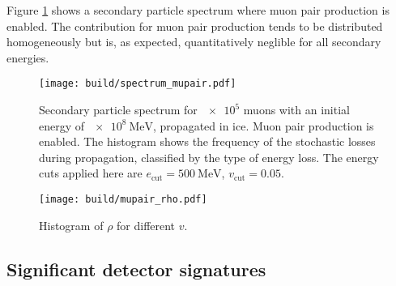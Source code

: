 Figure \ref{fig:spectrum_mupair} shows a secondary particle spectrum where muon pair production is enabled.
The contribution for muon pair production tends to be distributed homogeneously but is, as expected, quantitatively neglible for all secondary energies.

\begin{figure}
    \centering
    \texttt{[image: build/spectrum\_mupair.pdf]}
    \caption{Secondary particle spectrum for $\num{e5}$ muons with an initial energy of $\SI{e8}{\mega\electronvolt}$, propagated in ice. Muon pair production is enabled. The histogram shows the frequency of the stochastic losses during propagation, classified by the type of energy loss. The energy cuts applied here are $e_\text{cut} = \SI{500}{\mega\electronvolt}$, $v_\text{cut} = 0.05$.}
    \label{fig:spectrum_mupair}
\end{figure}

\begin{figure}
    \centering
    \texttt{[image: build/mupair\_rho.pdf]}
    \caption{Histogram of $\rho$ for different $v$.}
    \label{fig:rho_mupair}
\end{figure}

\subsection{Significant detector signatures}
\label{sec:signatures}